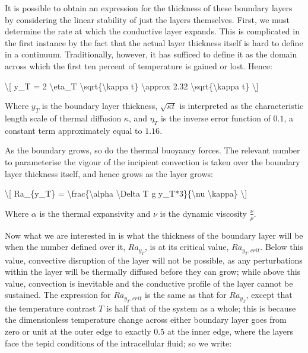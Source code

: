 \documentclass[letterpaper,10pt,english]{jupyterBook}
\begin{document}
\sphinxAtStartPar
It is possible to obtain an expression for the thickness of these boundary layers by considering the linear stability of just the layers themselves. First, we must determine the rate at which the conductive layer expands. This is complicated in the first instance by the fact that the actual layer thickness itself is hard to define in a continuum. Traditionally, however, it has sufficed to define it as the domain across which the first ten percent of temperature is gained or lost. Hence:

\sphinxAtStartPar
\textbackslash{}{[} y\_T = 2 \textbackslash{}eta\_T \textbackslash{}sqrt\{\textbackslash{}kappa t\} \textbackslash{}approx 2.32 \textbackslash{}sqrt\{\textbackslash{}kappa t\} \textbackslash{}{]}

\sphinxAtStartPar
Where \(y_T\) is the boundary layer thickness, \(\sqrt{\kappa t}\) is interpreted as the characteristic length scale of thermal diffusion \(\kappa\), and \(\eta_T\) is the inverse error function of \(0.1\), a constant term approximately equal to \(1.16\).

\sphinxAtStartPar
As the boundary grows, so do the thermal buoyancy forces. The relevant  number to parameterise the vigour of the incipient convection is taken over the boundary layer thickness itself, and hence grows as the layer grows:

\sphinxAtStartPar
\textbackslash{}{[} Ra\_\{y\_T\} = \textbackslash{}frac\{\textbackslash{}alpha \textbackslash{}Delta T g y\_T*3\}\{\textbackslash{}nu \textbackslash{}kappa\} \textbackslash{}{]}

\sphinxAtStartPar
Where \(\alpha\) is the thermal expansivity and \(\nu\) is the dynamic viscosity \(\frac{\nu}{\rho}\).

\sphinxAtStartPar
Now what we are interested in is what the thickness of the boundary layer will be when the  number defined over it, \(Ra_{y_T}\), is at its critical value, \(Ra_{y_T,crit}\). Below this value, convective disruption of the layer will not be possible, as any perturbations within the layer will be thermally diffused before they can grow; while above this value, convection is inevitable and the conductive profile of the layer cannot be sustained. The expression for \(Ra_{y_T,crit}\) is the same as that for \(Ra_{y_T}\), except that the temperature contrast \(T\) is half that of the system as a whole; this is because the dimensionless temperature change across either boundary layer goes from zero or unit at the outer edge to exactly \(0.5\) at the inner edge, where the layers face the tepid conditions of the intracellular fluid; so we write:
\end{document}
